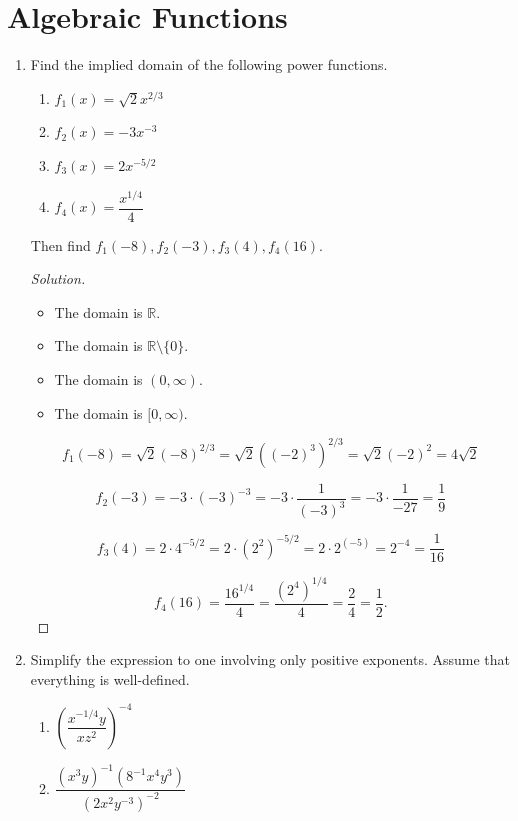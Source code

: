 \documentclass[12pt]{article}
\newenvironment{solution}{\begin{proof}[Solution]}{\end{proof}}
\begin{document}
	\section{Algebraic Functions}
	\begin{enumerate}
		
		\item Find the implied domain of the following power functions.
		\begin{enumerate}
			\item $f_1(x)=\sqrt{2}x^{2/3}$
			
			\item $f_2(x)=-3x^{-3}$
		
			\item $f_3(x)=2x^{-5/2}$
		
			\item $f_4(x)=\dfrac{x^{1/4}}{4}$
			
		\end{enumerate}
		Then find $f_1(-8), f_2(-3), f_3(4), f_4(16)$.
		\begin{solution}
			\begin{itemize}
				\item[(a)] The domain is $\mathbb{R}$.
				\item[(b)] The domain is $\mathbb{R}\setminus \{0\}$.
				\item[(c)] The domain is $(0,\infty)$.
				\item[(d)] The domain is $[0,\infty)$.
			\end{itemize}
			$$f_1(-8)=\sqrt{2}(-8)^{2/3}=\sqrt{2}((-2)^3)^{2/3}=\sqrt{2} (-2)^2=4\sqrt{2}$$
			
			$$f_2(-3)=-3\cdot(-3)^{-3}=-3\cdot \dfrac{1}{(-3)^3}=-3\cdot \dfrac{1}{-27}=\dfrac{1}{9}$$
			
			$$f_3(4)=2\cdot 4^{-5/2}=2\cdot (2^2)^{-5/2}=2\cdot 2^{(-5)}=2^{-4}=\dfrac{1}{16}$$
			
			$$f_4(16)=\dfrac{16^{1/4}}{4}=\dfrac{(2^4)^{1/4}}{4}=\dfrac{2}{4}=\dfrac{1}{2}.$$
		\end{solution}
		
		\item Simplify the expression to one involving only positive exponents. Assume that everything is well-defined.
		\begin{enumerate}
			\item $\left(\dfrac{x^{-1/4}y}{xz^2}\right)^{-4}$
			
			\item $\dfrac{(x^3y)^{-1}(8^{-1}x^4y^3)}{(2x^2y^{-3})^{-2}}$
		

\end{enumerate}
\end{enumerate}
\end{document}
